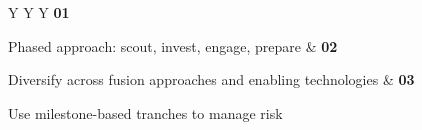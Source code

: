 \documentclass[10pt,a4paper]{article}
\begin{document}
\vspace{5pt}\noindent\begin{tabularx}{\linewidth}{Y Y Y}
{\textcolor{BOGreen}{\bfseries 01}}\par{\scriptsize\color{BOText} Phased approach: scout, invest, engage, prepare} & {\textcolor{BOGreen}{\bfseries 02}}\par{\scriptsize\color{BOText} Diversify across fusion approaches and enabling technologies} & {\textcolor{BOGreen}{\bfseries 03}}\par{\scriptsize\color{BOText} Use milestone-based tranches to manage risk} \\
\end{tabularx}\par\vspace{2pt}
\label{chap:8:end}
\end{document}
